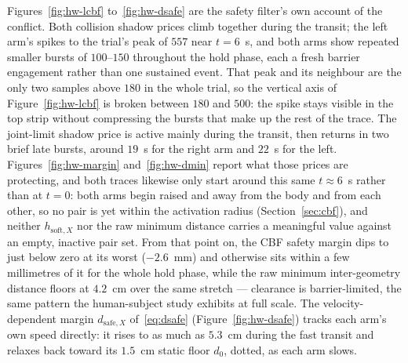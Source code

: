 Figures~\ref{fig:hw-lcbf} to~\ref{fig:hw-dsafe} are the safety filter's own account of the conflict. Both collision shadow prices climb together during the transit; the left arm's spikes to the trial's peak of $557$ near $t=6$~s, and both arms show repeated smaller bursts of $100$--$150$ throughout the hold phase, each a fresh barrier engagement rather than one sustained event. That peak and its neighbour are the only two samples above $180$ in the whole trial, so the vertical axis of Figure~\ref{fig:hw-lcbf} is broken between $180$ and $500$: the spike stays visible in the top strip without compressing the bursts that make up the rest of the trace. The joint-limit shadow price is active mainly during the transit, then returns in two brief late bursts, around $19$~s for the right arm and $22$~s for the left. Figures~\ref{fig:hw-margin} and~\ref{fig:hw-dmin} report what those prices are protecting, and both traces likewise only start around this same $t\approx6$~s rather than at $t=0$: both arms begin raised and away from the body and from each other, so no pair is yet within the activation radius (Section~\ref{sec:cbf}), and neither $h_{\text{soft},X}$ nor the raw minimum distance carries a meaningful value against an empty, inactive pair set. From that point on, the CBF safety margin dips to just below zero at its worst ($-2.6$~mm) and otherwise sits within a few millimetres of it for the whole hold phase, while the raw minimum inter-geometry distance floors at $4.2$~cm over the same stretch --- clearance is barrier-limited, the same pattern the human-subject study exhibits at full scale. The velocity-dependent margin $d_{\text{safe},X}$ of~\eqref{eq:dsafe} (Figure~\ref{fig:hw-dsafe}) tracks each arm's own speed directly: it rises to as much as $5.3$~cm during the fast transit and relaxes back toward its $1.5$~cm static floor $d_0$, dotted, as each arm slows.

